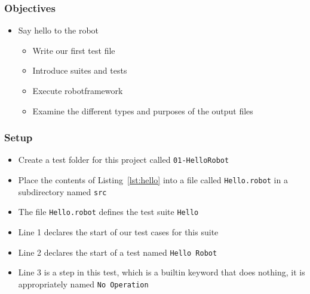 \documentclass[xcolor=table,handout]{beamer}
\newcounter{listings}
\begin{document}
\begin{frame}[fragile]\frametitle{Objectives}
    \begin{itemize}
        \item Say hello to the robot
            \begin{itemize}
                \item Write our first test file
                \item Introduce suites and tests
                \item Execute robotframework
                \item Examine the different types and purposes of the output files
            \end{itemize}
    \end{itemize}
\end{frame}

\begin{frame}[fragile]\frametitle{Setup}
    \begin{itemize}
        \item Create a test folder for this project called \texttt{01-HelloRobot}
        \item Place the contents of Listing~\ref{lst:hello} into a file called \texttt{Hello.robot} in a subdirectory named \texttt{src}
    \end{itemize}
    \begin{itemize}
        \item The file \texttt{Hello.robot} defines the test suite \texttt{Hello}
        \item Line 1 declares the start of our test cases for this suite
        \item Line 2 declares the start of a test named \texttt{Hello Robot}
        \item Line 3 is a step in this test, which is a builtin keyword that does nothing, it is appropriately named \texttt{No Operation}
    \end{itemize}
\end{frame}
\end{document}
